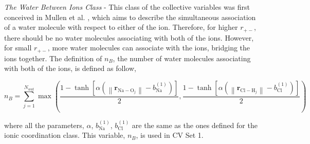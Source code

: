 \begin{spacing}{2.0}


    \textsl{The Water Between Ions Class} - This class of the collective variables was first conceived in Mullen et al. \cite{P-JCTC-2014-v10-Mullen}, which
    aims to describe the simultaneous association of a water molecule with respect to either of the ion. Therefore, for higher $r_{+-}$, there should be
    no water molecules associating with both of the ions. However, for small $r_{+-}$, more water molecules can associate with the ions, bridging the
    ions together. The definition of $n_B$, the number of water molecules associating with both of the ions, is defined as follow,

    \begin{equation}
        n_B = \sum_{j=1}^{N_{wat}}\max\left(\frac{1-\tanh\left[\alpha\left(\left\lVert \mathbf{r}_{\mathrm{Na-O}_j} \right\rVert - b_{\mathrm{Na}}^{(1)}\right)\right]}{2}, 
            \frac{1-\tanh\left[\alpha\left(\left\lVert \mathbf{r}_{\mathrm{Cl-H}_j} \right\rVert - b_{\mathrm{Cl}}^{(1)}\right)\right]}{2}\right)
    \end{equation}

    \noindent where all the parameters, $\alpha$, $b_{\mathrm{Na}}^{(1)}$, $b_{\mathrm{Cl}}^{(1)}$ are the same as the ones defined for the ionic coordination
    class. This variable, $n_B$, is used in CV Set 1. %


\end{spacing}
